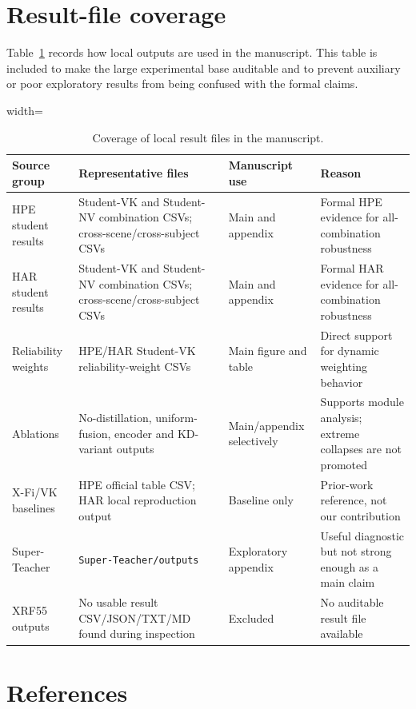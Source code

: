 \documentclass[preprint,12pt]{elsarticle}
\begin{document}
\section{Result-file coverage}

Table~\ref{tab:result_file_coverage} records how local outputs are used in the manuscript. This table is included to make the large experimental base auditable and to prevent auxiliary or poor exploratory results from being confused with the formal claims.

\begin{table}[h]
\centering
\caption{Coverage of local result files in the manuscript.}
\label{tab:result_file_coverage}
\scriptsize
\begin{adjustbox}{width=\textwidth}
\begin{tabular}{p{}p{}p{}p{}}
\toprule
Source group & Representative files & Manuscript use & Reason \\
\midrule
HPE student results & Student-VK and Student-NV combination CSVs; cross-scene/cross-subject CSVs & Main and appendix & Formal HPE evidence for all-combination robustness \\
HAR student results & Student-VK and Student-NV combination CSVs; cross-scene/cross-subject CSVs & Main and appendix & Formal HAR evidence for all-combination robustness \\
Reliability weights & HPE/HAR Student-VK reliability-weight CSVs & Main figure and table & Direct support for dynamic weighting behavior \\
Ablations & No-distillation, uniform-fusion, encoder and KD-variant outputs & Main/appendix selectively & Supports module analysis; extreme collapses are not promoted \\
X-Fi/VK baselines & HPE official table CSV; HAR local reproduction output & Baseline only & Prior-work reference, not our contribution \\
Super-Teacher & \texttt{Super-Teacher/outputs} & Exploratory appendix & Useful diagnostic but not strong enough as a main claim \\
XRF55 outputs & No usable result CSV/JSON/TXT/MD found during inspection & Excluded & No auditable result file available \\
\bottomrule
\end{tabular}
\end{adjustbox}
\end{table}

\section{References}
\end{document}
